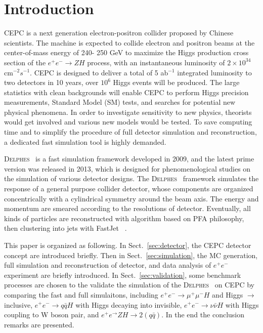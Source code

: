 \documentclass[a4paper,10pt,twoside]{cpc-hepnp}
\begin{document}
%




\section{Introduction}\label{sec:intro}
CEPC\cite{ref:cepc_det, ref:cepc_acc} is a next generation electron-positron collider proposed by Chinese scientists.
The machine is expected to collide electron and positron beams at the center-of-mass energy of 240- 250 GeV to maximize the Higgs production cross section of the $e^+e^− \to ZH$ process, with an instantaneous luminosity of $2\times10^{34}$ cm$^{-2} s^{-1}$.
CEPC is designed to deliver a total of 5 ab$^{-1}$ integrated luminosity to two detectors in 10 years, over $10^6$ Higgs events will be produced. 
The large statistics with clean backgrounds will enable CEPC to perform Higgs precision measurements, 
Standard Model (SM) tests, and searches for potential new physical phenomena.
In order to investigate  sensitivity to new physics, theorists would get involved and various new models would be tested. To save computing time and to simplify  the procedure of full detector simulation and reconstruction,  a dedicated fast simulation tool is highly demanded. 

{\textsc{Delphes}~}\cite{ref:delphes} is a fast simulation framework  developed in 2009, and the latest prime version was released in 2013, which is designed for phenomenological studies on the simulation of various detector designs.  
The {\textsc{Delphes}~} framework simulates the response of a general purpose collider detector,  
whose components  are organized concentrically with a cylindrical symmetry around the beam axis. The energy and momentum are smeared according to the resolutions of detector. Eventually, all kinds of particles are reconstructed with algorithm based on PFA\cite{ref:pfa} philosophy, then clustering into jets with FastJet~\cite{ref:fastjet} .

This paper is organized as following.  In Sect.{~\ref{sec:detector}}, the CEPC detector concept are introduced briefly.  Then in Sect.{~\ref{sec:simulation}}, the MC generation, full simulation and reconstruction of detector,  and data analysis of $e^+e^-$  experiment are briefly introduced. In Sect.{~\ref{sec:validation}}, some benchmark processes are chosen to the validate the simulation of  the {\textsc{Delphes}~} on CEPC by comparing the fast and full simulaitons, including  $e^+e^- \to \mu^+\mu^- H$  and Higgs $\to $inclusive, $e^+e^- \to q\bar{q} H$ with Higgs decaying into invisible, $e^+e^- \to \nu\bar{\nu} H$ with Higgs coupling to W boson pair, and $e^+e^\to ZH \to 2(q\bar{q})$. In the end the conclusion remarks are presented. 
\end{document}
